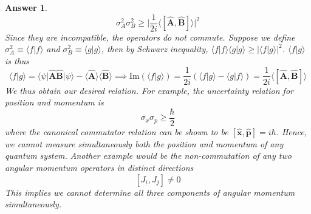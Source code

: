 \documentclass[a4paper]{article}
\newtheorem{ans}{Answer}[subsection]
\theoremstyle{new}
\begin{document}
\begin{ans}
$$\sigma_A^2\sigma_B^2\geq\bigg|\frac{1}{2i}\big\langle[\mathbf{\hat{A}},\mathbf{\hat{B}}]\big\rangle\bigg|^2$$
Since they are incompatible, the operators do not commute. Suppose we define $\sigma_A^2\equiv\big\langle f|f\big\rangle$ and $\sigma_B^2\equiv\big\langle g|g\big\rangle$, then by Schwarz inequality,
$\big\langle f|f\big\rangle\big\langle g|g\big\rangle\geq|\big\langle f|g\big\rangle|^2$. 
$\big\langle f|g\big\rangle$ is thus
$$\big\langle f|g\big\rangle=\big\langle\psi|\mathbf{\hat{A}}\mathbf{\hat{B}}|\psi\big\rangle-\big\langle\mathbf{\hat{A}}\big\rangle\big\langle\mathbf{\hat{B}}\big\rangle\implies\text{Im}(\big\langle f|g\big\rangle)=\frac{1}{2i}(\big\langle f|g\big\rangle-\big\langle g|f\big\rangle)=\frac{1}{2i}\big\langle[\mathbf{\hat{A}},\mathbf{\hat{B}}]\big\rangle$$
We thus obtain our desired relation. For example, the uncertainty relation for position and momentum is 
$$\sigma_x\sigma_p\geq\frac{\hbar}{2}$$
where the canonical commutator relation can be shown to be $[\mathbf{\hat{x}},\mathbf{\hat{p}}]=i\hbar$. Hence, we cannot measure simultaneously both the position and momentum of any quantum system. Another example would be the non-commutation of any two angular momentum operators in distinct directions
$$[J_i,J_j]\neq0$$
This implies we cannot determine all three components of angular momentum simultaneously.

\end{ans}
\end{document}
